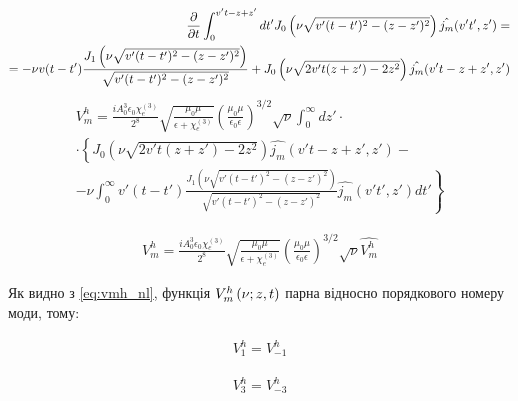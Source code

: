 %
\textcolor{blue} { \begin{equation*} \begin{aligned}
\partder{}{t} \int_0^{v't - z + z'} dt'
J_0 \left( \nu \sqrt{v'(t-t')^2 - (z-z')^2} \right) \hat{j_m} (v't',z') = \\
= - \nu v (t-t') 
\frac{J_1 \left( \nu \sqrt{v'(t-t')^2 - (z-z')^2} \right)}
{\sqrt{v'(t-t')^2 - (z-z')^2}} %
+ J_0 \left( \nu \sqrt{2 v't (z + z') - 2 z^2} \right) 
\hat{j_m} (v't - z + z',z')
\end{aligned} \end{equation*} }
%
\begin{equation} \begin{aligned} \label{eq:vmh_nl}
V_m^h = \frac{i A_0^3 \epsilon_0 \chi_e^{(3)}}{2^8}
\sqrt{\frac{\mu_0 \mu}{\epsilon + \chi_e^{(3)}}} 
\left( \frac{\mu_0 \mu}{\epsilon_0 \epsilon} \right)^{3/2} \sqrt{\nu}
\int_0^\infty dz' \cdot \\ \cdot 
\left\{ J_0 \left( \nu \sqrt{2 v't (z + z') - 2 z^2} \right) 
\hat{j_m} (v't - z + z',z') - \right. \\ 
\left. - \nu \int_0^\infty v'(t-t') 
\frac{J_1 \left( \nu \sqrt{v'(t-t')^2 - (z-z')^2} \right)}
{\sqrt{v'(t-t')^2 - (z-z')^2}} \hat{j_m} (v't',z') dt' \right\}
\end{aligned} \end{equation}

\begin{equation} \begin{aligned} \label{eq:vmh_norm}
V_m^h = \frac{i A_0^3 \epsilon_0 \chi_e^{(3)}}{2^8}
\sqrt{\frac{\mu_0 \mu}{\epsilon + \chi_e^{(3)}}} 
\left( \frac{\mu_0 \mu}{\epsilon_0 \epsilon} \right)^{3/2} 
\sqrt{\nu} \hat{V_m^h}
\end{aligned} \end{equation}

Як видно з \eqref{eq:vmh_nl}, функція $ V_m^h \left( \nu; z, t \right) $ парна відносно 
порядкового номеру моди, тому:

\begin{equation} \begin{aligned} \label{eq:vp1_vm1}
V_1^h = V_{-1}^h
\end{aligned} \end{equation}

\begin{equation} \begin{aligned} \label{eq:vp3_vm3}
V_3^h = V_{-3}^h
\end{aligned} \end{equation}

